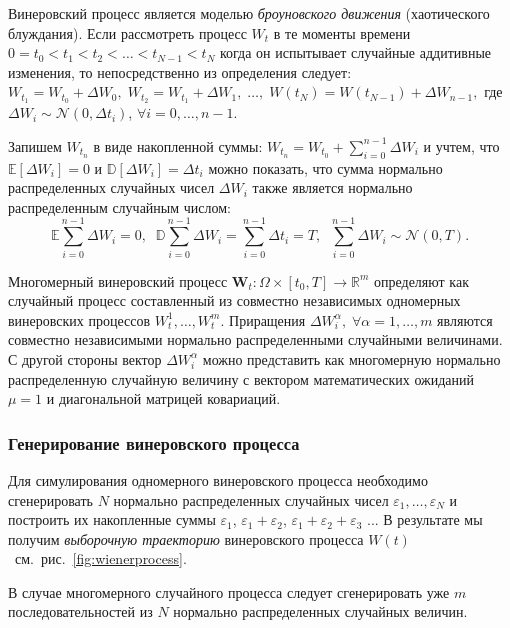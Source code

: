 \documentclass[%
floatfix,
showkeys,
nofootinbib, %
superscriptaddress, %
]{revtex4-1}
\begin{document}
Винеровский процесс является моделью \emph{броуновского движения}
(хаотического блуждания). Если рассмотреть процесс $W_t$ в те моменты
времени $0 = t_{0} < t_{1} < t_{2} < \ldots < t_{N-1} < t_{N}$ когда
он испытывает случайные аддитивные изменения, то непосредственно из
определения следует:
$ W_{t_{1}} = W_{t_{0}} + \Delta W_0,\; W_{t_{2}} = W_{t_{1}} + \Delta
W_1,\; \ldots,\; W(t_{N}) = W(t_{N-1}) + \Delta W_{n-1}, $ где
$\Delta W_{i} \sim \mathcal{N}(0,\Delta t_{i})$,
$\forall i = 0,\ldots,n-1$.

Запишем $W_{t_{n}}$ в виде накопленной суммы:
$ W_{t_{n}} = W_{t_{0}} + \sum\limits_{i=0}^{n-1}\Delta W_{i} $ и
учтем, что $\mathbb{E}[\Delta W_{i}] = 0$ и
$\mathbb{D}[\Delta W_{i}] = \Delta t_{i}$ можно показать, что сумма
нормально распределенных случайных чисел $\Delta W_{i}$ также является
нормально распределенным случайным числом:
\[
        \mathbb{E}\sum\limits_{i=0}^{n-1}\Delta W_{i} = 0, \;\; \mathbb{D}\sum\limits_{i=0}^{n-1}\Delta W_{i} = \sum\limits_{i=0}^{n-1} \Delta t_{i} = T,\;\; \sum\limits_{i=0}^{n-1}\Delta W_{i} \sim \mathcal{N}(0,T).
\]

Многомерный винеровский процесс
$\mathbf{W}_{t}\colon \Omega\times[t_{0},T]\to \mathbb{R}^{m}$
определяют как случайный процесс составленный из совместно независимых
одномерных винеровских процессов $W^{1}_t,\ldots,W^{m}_t$. Приращения
$\Delta W^{\alpha}_{i},\;\forall \alpha = 1,\ldots,m$ являются
совместно независимыми нормально распределенными случайными
величинами. С другой стороны вектор $\Delta W^{\alpha}_{i}$ можно
представить как многомерную нормально распределенную случайную
величину с вектором математических ожиданий $\mu = 1$ и диагональной
матрицей ковариаций.

\subsubsection{Генерирование винеровского процесса}

Для симулирования одномерного винеровского процесса необходимо
сгенерировать $N$ нормально распределенных случайных чисел
$\varepsilon_{1}, \ldots, \varepsilon_{N}$ и построить их накопленные
суммы $\varepsilon_{1}$, $\varepsilon_{1} + \varepsilon_{2}$,
$\varepsilon_{1} + \varepsilon_{2} + \varepsilon_{3}$ ... В результате
мы получим \emph{выборочную траекторию} винеровского процесса
$W(t)$~см.~рис.~\ref{fig:wienerprocess}.

В случае многомерного случайного процесса следует сгенерировать уже
$m$ последовательностей из $N$ нормально распределенных случайных
величин.
\end{document}
